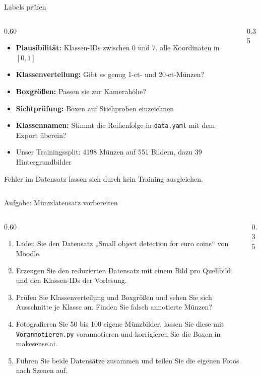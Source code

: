 \begin{frame}{Labels prüfen}
\footnotesize
\begin{columns}
\begin{column}{0.60\textwidth}
\begin{itemize}
  \item \textbf{Plausibilität:} Klassen-IDs zwischen $0$ und $7$, alle Koordinaten in $[0, 1]$
  \item \textbf{Klassenverteilung:} Gibt es genug 1-ct- und 20-ct-Münzen?
  \item \textbf{Boxgrößen:} Passen sie zur Kamerahöhe?
  \item \textbf{Sichtprüfung:} Boxen auf Stichproben einzeichnen
  \item \textbf{Klassennamen:} Stimmt die Reihenfolge in \texttt{data.yaml} mit dem Export überein?
  \item Unser Trainingssplit: 4198 Münzen auf 551 Bildern, dazu 39 Hintergrundbilder
\end{itemize}
\vspace{0.5em}
Fehler im Datensatz lassen sich durch kein Training ausgleichen.
\end{column}
\begin{column}{0.35\textwidth}
\centering
{}
\end{column}
\end{columns}
\end{frame}
\begin{frame}{Aufgabe: Münzdatensatz vorbereiten}
\footnotesize
\begin{columns}
\begin{column}{0.60\textwidth}
\begin{enumerate}
  \item Laden Sie den Datensatz „Small object detection for euro coins“ von Moodle.
  \item Erzeugen Sie den reduzierten Datensatz mit einem Bild pro Quellbild und den Klassen-IDs der Vorlesung.
  \item Prüfen Sie Klassenverteilung und Boxgrößen und sehen Sie sich Ausschnitte je Klasse an. Finden Sie falsch annotierte Münzen?
  \item Fotografieren Sie 50 bis 100 eigene Münzbilder, lassen Sie diese mit \texttt{Vorannotieren.py} vorannotieren und korrigieren Sie die Boxen in makesense.ai.
  \item Führen Sie beide Datensätze zusammen und teilen Sie die eigenen Fotos nach Szenen auf.
\end{enumerate}
\end{column}
\begin{column}{0.35\textwidth}
\centering
{}
\end{column}
\end{columns}
\end{frame}

